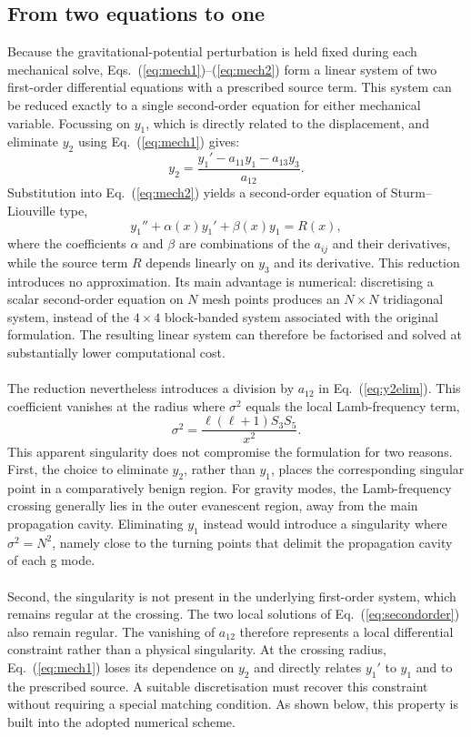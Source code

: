 \documentclass[]{aa}
\begin{document}
\subsection{From two equations to one}
\label{sec:reduction}
Because the gravitational-potential perturbation is held fixed during each mechanical solve, Eqs.~(\ref{eq:mech1})--(\ref{eq:mech2}) form a linear system of two first-order differential equations with a prescribed source term. This system can be reduced exactly to a single second-order equation for either mechanical variable. Focussing on $y_1$, which is directly related to the displacement, and eliminate $y_2$ using Eq.~(\ref{eq:mech1}) gives:
\begin{equation}
y_2=\frac{y_1'-a_{11}y_1-a_{13}y_3}{a_{12}} .
\label{eq:y2elim}
\end{equation}
Substitution into Eq.~(\ref{eq:mech2}) yields a second-order equation of Sturm--Liouville type,
\begin{equation}
y_1''+\alpha(x)y_1'+\beta(x)y_1 = R(x),
\label{eq:secondorder}
\end{equation}
where the coefficients $\alpha$ and $\beta$ are combinations of the $a_{ij}$ and their derivatives, while the source term $R$ depends linearly on $y_3$ and its derivative. This reduction introduces no approximation. Its main advantage is numerical: discretising a scalar second-order equation on $N$ mesh points produces an $N\times N$ tridiagonal system, instead of the $4\times4$ block-banded system associated with the original formulation. The resulting linear system can therefore be factorised and solved at substantially lower computational cost.
\\~\\The reduction nevertheless introduces a division by $a_{12}$ in Eq.~(\ref{eq:y2elim}). This coefficient vanishes at the radius where $\sigma^2$ equals the local Lamb-frequency term,
\begin{equation}
\sigma^2=\frac{\ell(\ell+1)S_3S_5}{x^2}.
\end{equation}
This apparent singularity does not compromise the formulation for two reasons. First, the choice to eliminate $y_2$, rather than $y_1$, places the corresponding singular point in a comparatively benign region. For gravity modes, the Lamb-frequency crossing generally lies in the outer evanescent region, away from the main propagation cavity. Eliminating $y_1$ instead would introduce a singularity where $\sigma^2=N^2$, namely close to the turning points that delimit the propagation cavity of each g mode.
\\~\\Second, the singularity is not present in the underlying first-order system, which remains regular at the crossing. The two local solutions of Eq.~(\ref{eq:secondorder}) also remain regular. The vanishing of $a_{12}$ therefore represents a local differential constraint rather than a physical singularity. At the crossing radius, Eq.~(\ref{eq:mech1}) loses its dependence on $y_2$ and directly relates $y_1'$ to $y_1$ and to the prescribed source. A suitable discretisation must recover this constraint without requiring a special matching condition. As shown below, this property is built into the adopted numerical scheme.
\end{document}
